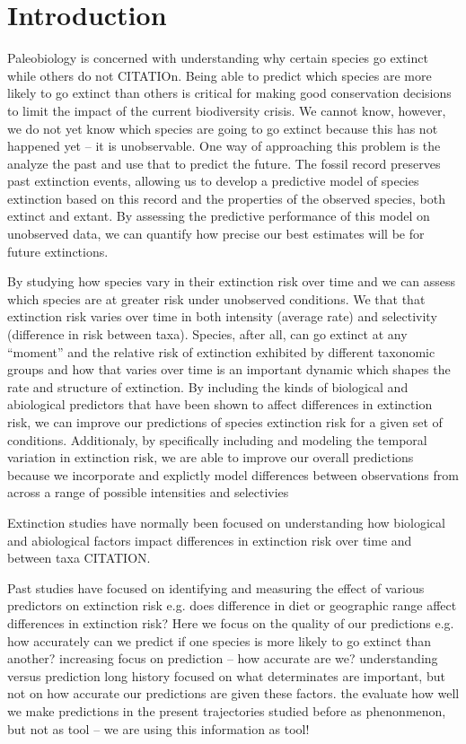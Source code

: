 \documentclass[12pt,letterpaper]{article}
\begin{document}
\section{Introduction}

Paleobiology is concerned with understanding why certain species go extinct while others do not CITATIOn. Being able to predict which species are more likely to go extinct than others is critical for making good conservation decisions to limit the impact of the current biodiversity crisis. We cannot know, however, we do not yet know which species are going to go extinct because this has not happened yet -- it is unobservable. One way of approaching this problem is the analyze the past and use that to predict the future. The fossil record preserves past extinction events, allowing us to develop a predictive model of species extinction based on this record and the properties of the observed species, both extinct and extant. By assessing the predictive performance of this model on unobserved data, we can quantify how precise our best estimates will be for future extinctions. 

By studying how species vary in their extinction risk over time and we can assess which species are at greater risk under unobserved conditions. We that that extinction risk varies over time in both intensity (average rate) and selectivity (difference in risk between taxa). Species, after all, can go extinct at any ``moment'' and the relative risk of extinction exhibited by different taxonomic groups and how that varies over time is an important dynamic which shapes the rate and structure of extinction. By including the kinds of biological and abiological predictors that have been shown to affect differences in extinction risk, we can improve our predictions of species extinction risk for a given set of conditions. Additionaly, by specifically including and modeling the temporal variation in extinction risk, we are able to improve our overall predictions because we incorporate and explictly model differences between observations from across a range of possible intensities and selectivies

Extinction studies have normally been focused on understanding how biological and abiological factors impact differences in extinction risk over time and between taxa CITATION.

Past studies have focused on identifying and measuring the effect of various predictors on extinction risk e.g. does difference in diet or geographic range affect differences in extinction risk?
Here we focus on the quality of our predictions e.g. how accurately can we predict if one species is more likely to go extinct than another?
increasing focus on prediction -- how accurate are we?
understanding versus prediction
long history focused on what determinates are important, but not on how accurate our predictions are given these factors.
the evaluate how well we make predictions in the present
trajectories studied before as phenonmenon, but not as tool -- we are using this information as tool!
\end{document}
